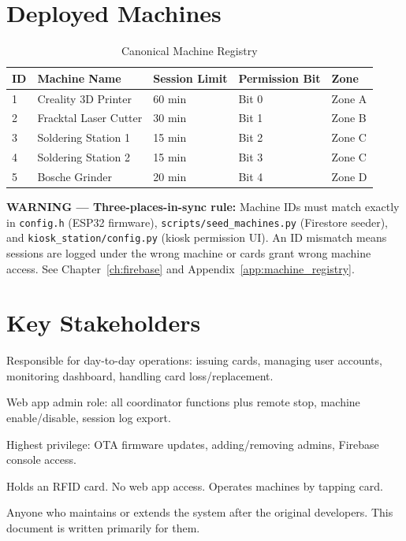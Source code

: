 \section{Deployed Machines}

\begin{table}[H]
\centering
\caption{Canonical Machine Registry}
\label{tab:machines}
\begin{tabular}{C{1.5cm}L{4.5cm}C{2.5cm}C{2.5cm}C{2cm}}
\toprule
\textbf{ID} & \textbf{Machine Name} & \textbf{Session Limit} & \textbf{Permission Bit} & \textbf{Zone} \\
 & Creality 3D Printer     & 60 min & Bit 0 & Zone A \\
2 & Fracktal Laser Cutter   & 30 min & Bit 1 & Zone B \\
3 & Soldering Station 1     & 15 min & Bit 2 & Zone C \\
4 & Soldering Station 2     & 15 min & Bit 3 & Zone C \\
5 & Bosche Grinder          & 20 min & Bit 4 & Zone D \\
\bottomrule
\end{tabular}
\end{table}

\begin{warnbox}
\textbf{WARNING — Three-places-in-sync rule:} Machine IDs must match exactly in \texttt{config.h} (ESP32 firmware), \texttt{scripts/seed\_machines.py} (Firestore seeder), and \texttt{kiosk\_station/config.py} (kiosk permission UI). An ID mismatch means sessions are logged under the wrong machine or cards grant wrong machine access. See Chapter~\ref{ch:firebase} and Appendix~\ref{app:machine_registry}.
\end{warnbox}

\section{Key Stakeholders}

\begin{description}[leftmargin=2em,font=\bfseries]
    \item[Lab Coordinator] Responsible for day-to-day operations: issuing cards, managing user accounts, monitoring dashboard, handling card loss/replacement.
    \item[Admin] Web app admin role: all coordinator functions plus remote stop, machine enable/disable, session log export.
    \item[Super Admin] Highest privilege: OTA firmware updates, adding/removing admins, Firebase console access.
    \item[Student] Holds an RFID card. No web app access. Operates machines by tapping card.
    \item[Future Maintainer] Anyone who maintains or extends the system after the original developers. This document is written primarily for them.
\end{description}

